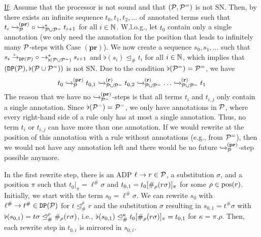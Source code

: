 \begin{myproof}
    \noindent
    \underline{If}:
    Assume that the processor is not sound and that $(\mathcal{P},\mathcal{P}^{=})$ is not SN.
    Then,  by  there exists an infinite sequence $t_0, t_1, t_2, \ldots$ 
    of annotated terms such that 
    $t_i \mathrel{ \xhookrightarrow{{}_{\scriptstyle }} \!\!{}^{(\mathbf{pr})}_{\mathcal{P}} } \circ \mathrel{ \xhookrightarrow{{}_{\scriptstyle }} \!\!{}^{*}_{\mathcal{P} \cup \mathcal{P}^{=}} } t_{i+1}$ 
    for all $i \in \mathbb{N}$.
    W.l.o.g., let $t_0$ contain only a single annotation (we only need the annotation for the position that leads to infinitely many $\mathcal{P}$-steps with Case $(\mathbf{pr})$).
    We now create a sequence $s_0, s_1, \ldots$ such that 
    $s_i \rootto_{\DP{\C{P}}} \circ \to_{\flat(\C{P} \cup \C{P}^{=})}^* s_{i+1}$
    and $\flat(s_i) \trianglelefteq_{\#} t_i$
    for all $i \in \mathbb{N}$, 
    which implies that $(\mathtt{DP}(\mathcal{P}),\flat(\mathcal{P} \cup \mathcal{P}^{=}))$ is not SN.
    Due to the condition $\flat(\mathcal{P}^=) = \mathcal{P}^=$, we have 
    \[  
        t_0 \tored{}{(\mathbf{pr})}{\C{P}} t_{0,1} \tored{}{(\mathbf{r})}{\C{P} \cup \C{P}^{=}}  t_{0,2} \tored{}{(\mathbf{r})}{\C{P} \cup \C{P}^{=}} \ldots \tored{}{(\mathbf{r})}{\C{P} \cup \C{P}^{=}} t_{1}
    \]
    The reason that we have no $\mathrel{ \xhookrightarrow{{}_{\scriptstyle }} \!\!{}^{(\mathbf{pr})}_{\mathcal{P}^{=}} }$-steps is that
all terms $t_i$ and $t_{i,j}$ 
only contain a single annotation.
  Since $\flat(\mathcal{P}^=) = \mathcal{P}^=$, we only have annotations in $\mathcal{P}$, where every
  right-hand side of a rule only has at most a single annotation.
  Thus, no term $t_i$ or $t_{i,j}$ can have more than one annotation.
    If we would rewrite at the position of this annotation with a rule without
    annotations (e.g., from $\mathcal{P}^{=}$), then we would not have any annotation left 
    and there would be no future $\mathrel{ \xhookrightarrow{{}_{\scriptstyle }} \!\!{}^{(\mathbf{pr})}_{\mathcal{P}} }$-step possible anymore.

    In the first rewrite step, there is an ADP $\ell \to r \in \mathcal{P}$, a substitution $\sigma$, and a position $\pi$
    such that $t_0|_{\pi} = \ell^\# \sigma$ and $t_{0,1} = t_{0}[\#_{\rho}(r \sigma)]_{\pi}$
    for some $\rho \in \mathrm{pos}(r)$.
    Initially, we start with the term $s_0 = \ell^\# \sigma$.
    We can rewrite $s_0$ with $\ell^\# \to t^\# \in \mathtt{DP}(\mathcal{P})$ for
    $t \trianglelefteq_{\#}^{\rho} r$ and the substitution $\sigma$
    resulting in $s_{0,1} = t^\# \sigma$
    with $\flat(s_{0,1}) = t\sigma  \trianglelefteq_{\#}^{\rho}
    \#_{\rho}(r \sigma)$, i.e.,
    $\flat(s_{0,1}) \trianglelefteq_{\#}^{\kappa}
    t_{0}[\#_{\rho}(r \sigma)]_{\pi}
     = t_{0,1}$ for $\kappa = \pi.\rho$.
    Then, each rewrite step in $t_{0,i}$
    is mirrored  in $s_{0,i}$.
    

\end{myproof}
